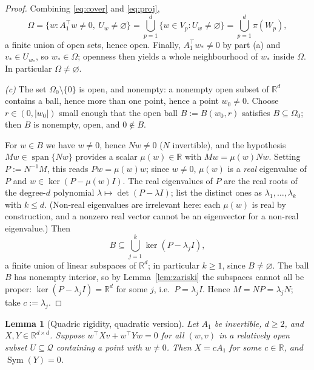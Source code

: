 \documentclass[11pt]{article}
\newtheorem{lemma}[theorem]{Lemma}
\theoremstyle{definition}
\theoremstyle{remark}
\theoremstyle{plain}
\newcommand{\R}{\mathbb{R}}
\newcommand{\cQ}{\mathcal{Q}}
\newcommand{\Sym}{\operatorname{Sym}}
\newcommand{\spn}{\operatorname{span}}
\begin{document}
\begin{proof}
Combining \eqref{eq:cover} and \eqref{eq:proj},
\[
\Omega=\{w:A_1^\top w\neq0,\ U_w\neq\varnothing\}
=\bigcup_{p=1}^d\{w\in V_p:U_w\neq\varnothing\}
=\bigcup_{p=1}^d\pi(W_p),
\]
a finite union of open sets, hence open.  Finally, $A_1^\top w_*\neq0$ by part (a) and
$v_*\in U_{w_*}$, so $w_*\in\Omega$; openness then yields a whole neighbourhood of $w_*$
inside $\Omega$.  In particular $\Omega\neq\varnothing$.

\emph{(c)}  The set $\Omega_0\setminus\{0\}$ is open, and nonempty: a nonempty open
subset of $\R^d$ contains a ball, hence more than one point, hence a point $w_0\neq0$.
Choose $r\in(0,|w_0|)$ small enough that the open ball $B:=B(w_0,r)$ satisfies
$B\subseteq\Omega_0$; then $B$ is nonempty, open, and $0\notin B$.

For $w\in B$ we have $w\neq0$, hence $Nw\neq0$ ($N$ invertible), and the hypothesis
$Mw\in\spn\{Nw\}$ provides a scalar $\mu(w)\in\R$ with $Mw=\mu(w)Nw$.  Setting
$P:=N^{-1}M$, this reads $Pw=\mu(w)w$; since $w\neq0$, $\mu(w)$ is a \emph{real}
eigenvalue of $P$ and $w\in\ker(P-\mu(w)I)$.  The real eigenvalues of $P$ are the real
roots of the degree-$d$ polynomial $\lambda\mapsto\det(P-\lambda I)$; list the distinct
ones as $\lambda_1,\dots,\lambda_k$ with $k\le d$.  (Non-real eigenvalues are irrelevant
here: each $\mu(w)$ is real by construction, and a nonzero real vector cannot be an
eigenvector for a non-real eigenvalue.)  Then
\[
B\subseteq\bigcup_{j=1}^k\ker(P-\lambda_jI),
\]
a finite union of linear subspaces of $\R^d$; in particular $k\ge1$, since
$B\neq\varnothing$.  The ball $B$ has nonempty interior, so by Lemma~\ref{lem:zariski}
the subspaces cannot all be proper: $\ker(P-\lambda_jI)=\R^d$ for some $j$, i.e.\
$P=\lambda_jI$.  Hence $M=NP=\lambda_jN$; take $c:=\lambda_j$.
\end{proof}

\begin{lemma}[Quadric rigidity, quadratic version]\label{lem:quadA}
Let $A_1$ be invertible, $d\ge2$, and $X,Y\in\R^{d\times d}$.  Suppose
$w^\top Xv+w^\top Yw=0$ for all $(w,v)$ in a relatively open subset $U\subseteq\cQ$
containing a point with $w\neq0$.  Then $X=cA_1$ for some $c\in\R$, and $\Sym(Y)=0$.
\end{lemma}
\end{document}
